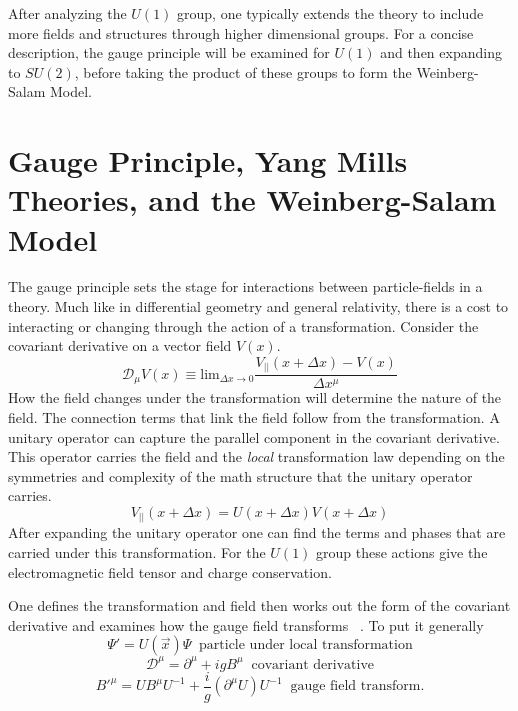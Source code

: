After analyzing the $U(1)$ group, one typically extends the theory to include more fields and structures through higher dimensional groups. For a concise description, the gauge principle will be examined for $U(1)$ and then expanding to $SU(2)$, before taking the product of these groups to form the Weinberg-Salam Model.

\section{Gauge Principle, Yang Mills Theories, and the Weinberg-Salam Model}
The gauge principle sets the stage for interactions between particle-fields in a theory. Much like in differential geometry and general relativity, there is a cost to interacting or changing through the action of a transformation. Consider the covariant derivative on a vector field $V(x)$.
\begin{equation}\mathcal{D}_\mu V(x) \equiv \text{lim}_{\Delta x \rightarrow 0 } \frac{V_{||}(x+\Delta x) - V(x)}{\Delta x^{\mu}} \end{equation} 
How the field changes under the transformation will determine the nature of the field. The connection terms that link the field follow from the transformation. A unitary operator can capture the parallel component in the covariant derivative. This operator carries the field and the \textit{local} transformation law depending on the symmetries and complexity of the math structure that the unitary operator carries. 
\begin{equation}V_{||}(x+\Delta x) = U(x+\Delta x)V(x+\Delta x)\end{equation}
After expanding the unitary operator one can find the terms and phases that are carried under this transformation. 
For the $U(1)$ group these actions give the electromagnetic field tensor and charge conservation. 

One defines the transformation and field then works out the form of the covariant derivative and examines how the gauge field transforms ~\cite{Tully:1417476}. To put it generally
\begin{equation}
\label{eq:lt}
\Psi'= U(\overrightarrow{x})\Psi \;\;\text{particle under local transformation}\end{equation}
\begin{equation}
\label{eq:cd}
\mathcal{D}^\mu = \partial^\mu + igB^\mu \;\;\text{covariant derivative}
\end{equation}
\begin{equation}
\label{eq:gt}
B'^\mu = UB^\mu U^{-1} + \frac{i}{g}(\partial^\mu U)U^{-1} \;\;\text{gauge field transform.} 
\end{equation} 


